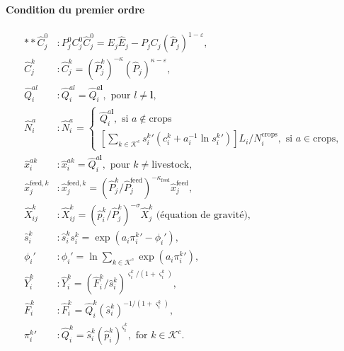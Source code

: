 \paragraph{Condition du premier ordre}
\begin{align}
    ** \hat{C}_j^0            & : P_j^0 C_j^0 \hat{C}_j^0 = E_j \hat{E}_j - P_jC_j (\hat{P}_j)^{1 - \varepsilon},                                                   \\
    \hat{C}_j^k               & : \hat{C}_j^k = (\hat{P}_j^k)^{-\kappa} (\hat{P}_j)^{\kappa - \varepsilon},                                                         \\
    \hat{Q}_i^{al}            & : \hat{Q}_i^{al}=\hat{Q}_i^{a \mathbf{l}}, \text{ pour } l \neq \mathbf{l},                                                         \\
    \hat{N}_i^a               & : \hat{N}_i^a =
    \begin{cases}
        \hat{Q}_i^{a \mathbf{l}}, \text{ si } a \notin \text{crops} \\
        \left[\sum_{k \in \mathcal{K}^c} {s_i^k}\prime \left(c_i^k+a_i^{-1} \ln {s_i^k}\prime  \right) \right] L_i / N_i^{\text{crops}}, \text{ si } a \in \text{crops},
    \end{cases}                                    \\
    \hat{x}_i^{ak}            & :\hat{x}_i^{ak}=\hat{Q}_i^{a \mathbf{l}}, \text{ pour } k \neq \text{livestock},                                                    \\
    \hat{x}^{\text{feed},k}_j & : \hat{x}^{\text{feed},k}_j = \left({\hat{P}_j^k} /{\hat{P}_j^{\text{feed}}} \right)^{-\kappa_{\text{feed}}} \hat{x}_j^\text{feed}, \\
    \hat{X}_{ij}^k            & : \hat{X}_{ij}^k = (\hat{p}_i^k/\hat{P}_j^k)^{-\sigma} \hat{X}_j^k \text{ (équation de gravité)},                                   \\
    \hat{s}_{i}^{k}           & : \hat{s}_i^k s_i^k = \exp \left( a_i {\pi_i^k}\prime - \phi_i\prime \right),                                                       \\
    \phi_i\prime              & : \phi_i\prime = \ln \sum_{k \in \mathcal{K}^c} \exp(a_i {\pi_i^k}\prime),                                                          \\
    \hat{Y}_i^k               & : \hat{Y}_i^k = \left(\hat{F}_i^k / \hat{s}_i^k \right)^{\varsigma_i^k/(1+\varsigma_i^k)},                                          \\
    \hat{F}_i^k               & : \hat{F}_i^k = \hat{Q}_i^k (\hat{s}_i^k)^{- 1 / (1 + \varsigma_i^k)},                                                              \\
    {\pi_i^k}\prime           & : \hat{Q}_i^k = \hat{s}_i^k \left(\hat{p}_i^k \right)^{\varsigma_i^k}, \text{ for } k\in \mathcal{K}^{c}.
\end{align}

